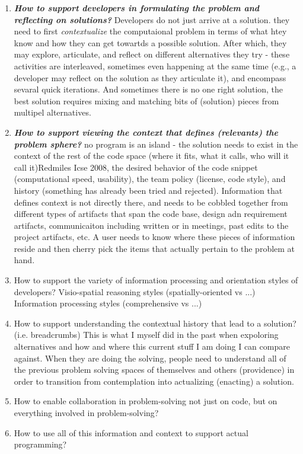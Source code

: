 \documentclass{ppig}
\begin{document}
\begin{enumerate}
	\item \textit\textbf{{How to support developers in formulating the problem and reflecting on solutions?}}
	Developers do not just arrive at a solution. they need to first \textit{contextualize} the computaional problem in terms of what htey know and how they can get towartds a possible solution. After which, they may explore, articulate, and reflect on different alternatives they try - these activities are interleaved, sometimes even happening at the same time (e.g., a developer may reflect on the solution as they articulate it), and encompass sevaral quick iterations. And sometimes there is no one right solution, the best solution requires mixing and matching bits of (solution) pieces from multipel alternatives.
    
    
    \item \textit\textbf{{How to support viewing the context that defines (relevants) the problem sphere?}}
   no program is an island - the solution needs to exist in the context of the rest of the code space (where it fits, what it calls, who will it call it)Redmiles Icse 2008, the desired behavior of the code snippet (computational speed, usability), the team policy (license, code style), and history (something has already been tried and rejected). Information that defines context is not directly there, and needs to be cobbled together from different types of artifacts that span the code base, design adn requirement artifacts, communicaiton including written or in meetings, past edits to the project artifacts, etc. A user needs to know where these pieces of information reside and then cherry pick the items that actually pertain to the problem at hand.
    
 	\item How to support the variety of information processing and orientation styles of developers?
	\subitem Visio-spatial reasoning styles (spatially-oriented vs ...)
	\subitem Information processing styles (comprehensive vs ...)
  
  
  
  \item How to support understanding the contextual history that lead to a solution? (i.e. breadcrumbs)
    This is what I myself did in the past when expoloring alternatives and how and where this current stuff I am doing I can compare against.
  When they are doing the solving, people need to understand all of the previous problem solving spaces of themselves and others (providence) in order to transition from contemplation into actualizing (enacting) a solution.  
  	


\item How to enable collaboration in problem-solving not just on code, but on everything involved in problem-solving?
	\item How to use all of this information and context to support actual programming?
\end{enumerate}
\end{document}
